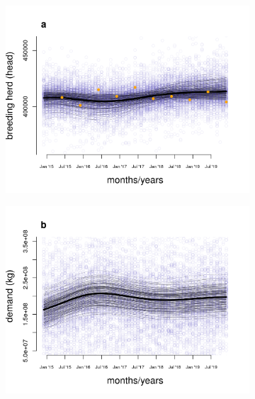 \documentclass[12pt]{article}
\begin{document}
\begin{figure}[t!]
  \begin{subfigure}{0.5\textwidth}
    \includegraphics[scale=0.5]{figure_3a.png}%
  \end{subfigure}%
  \begin{subfigure}{0.5\textwidth}
    \includegraphics[scale=0.5]{figure_3b.png}
  \end{subfigure}


\end{figure}
\end{document}
